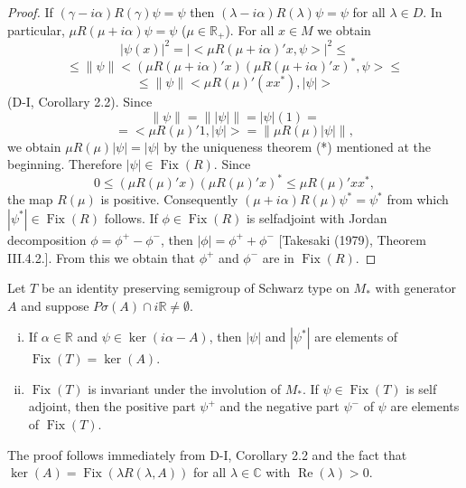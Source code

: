 
\begin{proof}
If $(\gamma - i\alpha)R(\gamma)\psi = \psi$ then $(\lambda - i\alpha)R(\lambda)\psi = \psi$ for all $\lambda \in D$.
In particular, $\mu R(\mu + i\alpha)\psi = \psi$ ($\mu \in \mathbb{R}_+$).
For all $x \in M$ we obtain
\[
|\psi(x)|^2 = |<\mu R(\mu+i\alpha)'x,\psi>|^2 \leq
\]
\[
\leq \|\psi\| <(\mu R(\mu+i\alpha)'x)(\mu R(\mu+i\alpha)'x)^*,\psi> \leq
\]
\[
\leq \|\psi\| <\mu R(\mu)'(xx^*),|\psi|>
\]
(D-I, Corollary 2.2).
Since
\[
\|\psi\| = \| |\psi| \| = |\psi|(1) =
\]
\[
= <\mu R(\mu)'1,|\psi|> = \| \mu R(\mu)|\psi| \|,
\]
we obtain $\mu R(\mu)|\psi| = |\psi|$ by the uniqueness theorem (*) mentioned at the beginning.
Therefore $|\psi| \in \operatorname{Fix}(R)$.
Since
\[
0 \leq (\mu R(\mu)'x)(\mu R(\mu)'x)^* \leq \mu R(\mu)'xx^*,
\]
the map $R(\mu)$ is positive.
Consequently $(\mu+i\alpha)R(\mu)\psi^* = \psi^*$ from which $|\psi^*| \in \operatorname{Fix}(R)$ follows.
If $\phi \in \operatorname{Fix}(R)$ is selfadjoint with Jordan decomposition $\phi = \phi^+ - \phi^-$, then $|\phi| = \phi^+ + \phi^-$ [Takesaki (1979), Theorem III.4.2.].
From this we obtain that $\phi^+$ and $\phi^-$ are in $\operatorname{Fix}(R)$.
\end{proof}
\begin{corollary}\label{cor:d3-1.5}
Let $T$ be an identity preserving semigroup of Schwarz type on $M_*$ with generator $A$ and suppose $P\sigma(A) \cap i\mathbb{R} \neq \emptyset$.

\begin{enumerate}[(i)]
\item
If $\alpha \in \mathbb{R}$ and $\psi \in \operatorname{ker}(i\alpha - A)$, then $|\psi|$ and $|\psi^*|$ are elements of $\operatorname{Fix}(T) = \operatorname{ker}(A)$.

\item 
$\operatorname{Fix}(T)$ is invariant under the involution of $M_*$.
If $\psi \in \operatorname{Fix}(T)$ is self adjoint, then the positive part $\psi^+$ and the negative part $\psi^-$ of $\psi$ are elements of $\operatorname{Fix}(T)$.
\end{enumerate}

\end{corollary}
The proof follows immediately from D-I, Corollary 2.2 and the fact that $\operatorname{ker}(A) = \operatorname{Fix}(\lambda R(\lambda,A))$ for all $\lambda \in \mathbb{C}$ with $\operatorname{Re}(\lambda) > 0$.

